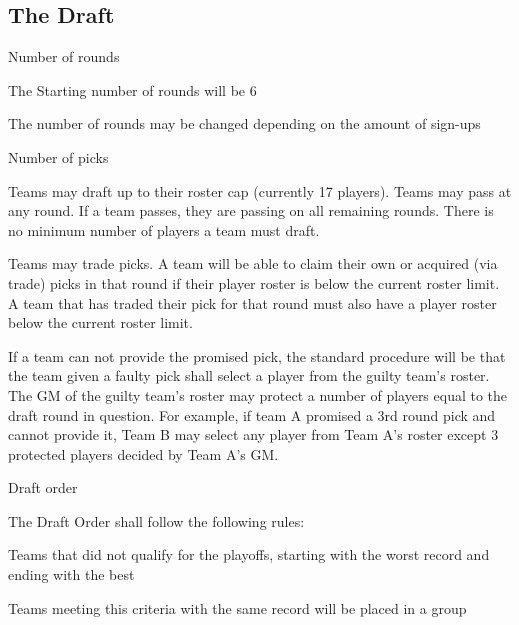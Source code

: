 \subsection{The Draft}
\begin{deepEnumerate}
	\item Number of rounds
	\begin{deepEnumerate}
		\item The Starting number of rounds will be 6
		\item The number of rounds may be changed depending on the amount of sign-ups
	\end{deepEnumerate}
	\item Number of picks
	\begin{deepEnumerate}
		\item Teams may draft up to their roster cap (currently 17 players). Teams may pass at any round.
		If a team passes, they are passing on all remaining rounds. There is no minimum number of players a team must draft.
		\item Teams may trade picks. A team will be able to claim their own or acquired (via trade) picks in that round if their player roster is below the current roster limit.
		A team that has traded their pick for that round must also have a player roster below the current roster limit.
		\begin{deepEnumerate}
			\item  If a team can not provide the promised pick, the standard procedure will be that
			the team given a faulty pick shall select a player from the guilty team's roster. The GM of the guilty
			team's roster may protect a number of players equal to the draft round in question. For example, if
 			team A promised a 3rd round pick and cannot provide it, Team B may select any player from Team A's
 			roster except 3 protected players decided by Team A's GM.
		\end{deepEnumerate}
	\end{deepEnumerate}
	\item Draft order
	\label{sec:Draft order}
	\begin{deepEnumerate}
		\item The Draft Order shall follow the following rules:
		\begin{deepEnumerate}
			\item Teams that did not qualify for the playoffs, starting with the worst record and ending with the best
			\begin{deepEnumerate}
				\item Teams meeting this criteria with the same record will be placed in a group

\end{deepEnumerate}
\end{deepEnumerate}
\end{deepEnumerate}
\end{deepEnumerate}
